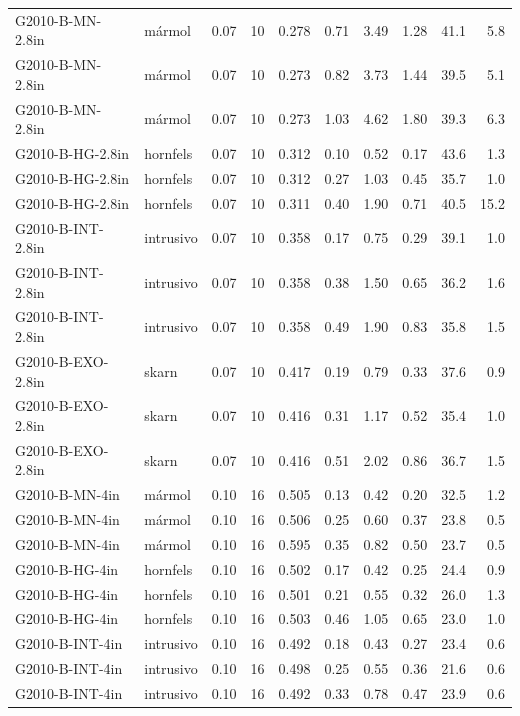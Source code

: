\documentclass[11pt,letterpaper]{article}
\begin{document}
\begin{footnotesize}
\begin{longtable}{L{3.6cm}L{2.2cm}rrrrrrrr}
G2010-B-MN-2.8in & mármol & 0.07 & 10 & 0.278 & 0.71 & 3.49 & 1.28 & 41.1 & 5.8 \\
G2010-B-MN-2.8in & mármol & 0.07 & 10 & 0.273 & 0.82 & 3.73 & 1.44 & 39.5 & 5.1 \\
G2010-B-MN-2.8in & mármol & 0.07 & 10 & 0.273 & 1.03 & 4.62 & 1.80 & 39.3 & 6.3 \\
G2010-B-HG-2.8in & hornfels & 0.07 & 10 & 0.312 & 0.10 & 0.52 & 0.17 & 43.6 & 1.3 \\
G2010-B-HG-2.8in & hornfels & 0.07 & 10 & 0.312 & 0.27 & 1.03 & 0.45 & 35.7 & 1.0 \\
G2010-B-HG-2.8in & hornfels & 0.07 & 10 & 0.311 & 0.40 & 1.90 & 0.71 & 40.5 & 15.2 \\
G2010-B-INT-2.8in & intrusivo & 0.07 & 10 & 0.358 & 0.17 & 0.75 & 0.29 & 39.1 & 1.0 \\
G2010-B-INT-2.8in & intrusivo & 0.07 & 10 & 0.358 & 0.38 & 1.50 & 0.65 & 36.2 & 1.6 \\
G2010-B-INT-2.8in & intrusivo & 0.07 & 10 & 0.358 & 0.49 & 1.90 & 0.83 & 35.8 & 1.5 \\
G2010-B-EXO-2.8in & skarn & 0.07 & 10 & 0.417 & 0.19 & 0.79 & 0.33 & 37.6 & 0.9 \\
G2010-B-EXO-2.8in & skarn & 0.07 & 10 & 0.416 & 0.31 & 1.17 & 0.52 & 35.4 & 1.0 \\
G2010-B-EXO-2.8in & skarn & 0.07 & 10 & 0.416 & 0.51 & 2.02 & 0.86 & 36.7 & 1.5 \\
G2010-B-MN-4in & mármol & 0.10 & 16 & 0.505 & 0.13 & 0.42 & 0.20 & 32.5 & 1.2 \\
G2010-B-MN-4in & mármol & 0.10 & 16 & 0.506 & 0.25 & 0.60 & 0.37 & 23.8 & 0.5 \\
G2010-B-MN-4in & mármol & 0.10 & 16 & 0.595 & 0.35 & 0.82 & 0.50 & 23.7 & 0.5 \\
G2010-B-HG-4in & hornfels & 0.10 & 16 & 0.502 & 0.17 & 0.42 & 0.25 & 24.4 & 0.9 \\
G2010-B-HG-4in & hornfels & 0.10 & 16 & 0.501 & 0.21 & 0.55 & 0.32 & 26.0 & 1.3 \\
G2010-B-HG-4in & hornfels & 0.10 & 16 & 0.503 & 0.46 & 1.05 & 0.65 & 23.0 & 1.0 \\
G2010-B-INT-4in & intrusivo & 0.10 & 16 & 0.492 & 0.18 & 0.43 & 0.27 & 23.4 & 0.6 \\
G2010-B-INT-4in & intrusivo & 0.10 & 16 & 0.498 & 0.25 & 0.55 & 0.36 & 21.6 & 0.6 \\
G2010-B-INT-4in & intrusivo & 0.10 & 16 & 0.492 & 0.33 & 0.78 & 0.47 & 23.9 & 0.6 \\

\end{longtable}
\end{footnotesize}
\end{document}
